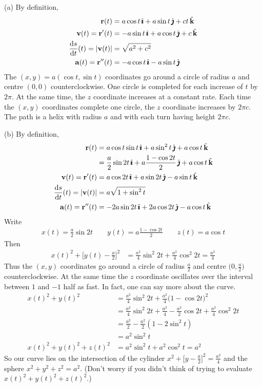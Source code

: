 \begin{solution}
(a) By definition,
\begin{align*}
\vr(t)&= a \cos t\,\hi+a\sin t\,\hj+ct\,\hk\\
\vv(t)=\vr'(t)&= -a \sin t\,\hi+a\cos t\,\hj+c\,\hk\\
\diff{s}{t}(t)=|\vv(t)|&= \sqrt{a^2+c^2}\\
\va(t)=\vr''(t)&= -a \cos t\,\hi-a\sin t\,\hj
\end{align*}
The $(x,y)= a(\cos t,\sin t)$ coordinates go 
     around a circle of radius $a$ and centre $(0,0)$ counterclockwise.
     One circle is completed for each increase of $t$ by $2\pi$.
     At the same time, the $z$ coordinate increases at a constant rate. 
     Each time the $(x,y)$ coordinates complete one circle, the $z$ 
     coordinate increases by $2 \pi c$.
The path is a helix with radius $a$ and with each turn having height $2\pi c$.

(b) By definition,
\begin{align*}
\vr(t)&= a \cos t\sin t\,\hi +a\sin^2 t\,\hj+a\cos t\,\hk\\
      &= \frac{a}{2} \sin 2t\,\hi+a\frac{1-\cos 2t}{2}\,\hj+a\cos t\,\hk\\
\vv(t)=\vr'(t)&= a \cos 2t\,\hi +a\sin 2t\,\hj-a\sin t\,\hk\\
\diff{s}{t}(t)=|\vv(t)|&= a\sqrt{1+\sin^2t}\\
\va(t)=\vr''(t)&= -2a \sin 2t\,\hi +2a\cos 2t\,\hj-a\cos t\,\hk
\end{align*}
Write
\begin{align*}
x(t)=\tfrac{a}{2} \sin 2t \qquad
y(t)=a\tfrac{1-\cos 2t}{2} \qquad
z(t)=a\cos t
\end{align*}
Then
\begin{align*}
x(t)^2+\big[y(t)-\tfrac{a}{2}\big]^2&=\tfrac{a^2}{4} \sin^2 2t + \tfrac{a^2}{4} \cos^2 2t 
                                     =\tfrac{a^2}{4} 
\end{align*}
Thus the $(x,y)$ coordinates go around a circle of radius $\frac{a}{2}$ and
centre $\big(0,\frac{a}{2}\big)$ counterclockwise. At the same time the $z$ coordinate oscillates over the interval between $1$ and $-1$ half as fast. In fact,
one can say more about the curve.
\begin{align*}
x(t)^2+y(t)^2&=\tfrac{a^2}{4} \sin^2 2t + \tfrac{a^2}{4}\big(1-\cos 2t\big)^2 \\
             &=\tfrac{a^2}{4} \sin^2 2t + \tfrac{a^2}{4} - \tfrac{a^2}{2}\cos 2t 
                 + \tfrac{a^2}{4} \cos^2 2t \\
             &= \tfrac{a^2}{2}  - \tfrac{a^2}{2} (1- 2\sin^2 t) \\
             &=  a^2\sin^2 t
\\
x(t)^2+y(t)^2+z(t)^2 &= a^2\sin^2 t + a^2\cos^2 t =a^2 
\end{align*}
So our curve lies on the intersection of the cylinder  
$x^2+\big[y-\tfrac{a}{2}\big]^2=\tfrac{a^2}{4}$ and the sphere $x^2+y^2+z^2=a^2$. 
(Don't worry if you didn't think of trying to evaluate $x(t)^2+y(t)^2+z(t)^2$.)
\end{solution}

